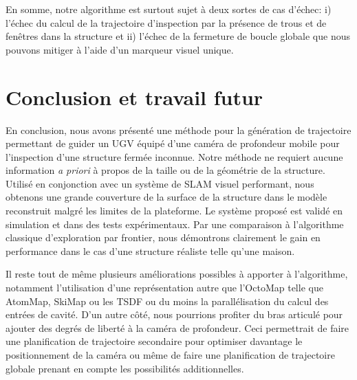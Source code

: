 En somme, notre algorithme est surtout sujet à deux sortes de cas d'échec: i) l'échec du calcul de la trajectoire d'inspection par la présence de trous et de fenêtres dans la structure et ii) l'échec de la fermeture de boucle globale que nous pouvons mitiger à l'aide d'un marqueur visuel unique.

\section{Conclusion et travail futur} \label{sec:ugv_conclusion}

En conclusion, nous avons présenté une méthode pour la génération de trajectoire permettant de guider un UGV équipé d'une caméra de profondeur mobile pour l'inspection d'une structure fermée inconnue. Notre méthode ne requiert aucune information \textit{a priori} à propos de la taille ou de la géométrie de la structure. Utilisé en conjonction avec un système de SLAM visuel performant, nous obtenons une grande couverture de la surface de la structure dans le modèle reconstruit malgré les limites de la plateforme. Le système proposé est validé en simulation et dans des tests expérimentaux. Par une comparaison à l'algorithme classique d'exploration par frontier, nous démontrons clairement le gain en performance dans le cas d'une structure réaliste telle qu'une maison.

Il reste tout de même plusieurs améliorations possibles à apporter à l'algorithme, notamment l'utilisation d'une représentation autre que l'OctoMap telle que AtomMap, SkiMap ou les TSDF ou du moins la parallélisation du calcul des entrées de cavité. D'un autre côté, nous pourrions profiter du bras articulé pour ajouter des degrés de liberté à la caméra de profondeur. Ceci permettrait de faire une planification de trajectoire secondaire pour optimiser davantage le positionnement de la caméra ou même de faire une planification de trajectoire globale prenant en compte les possibilités additionnelles.

